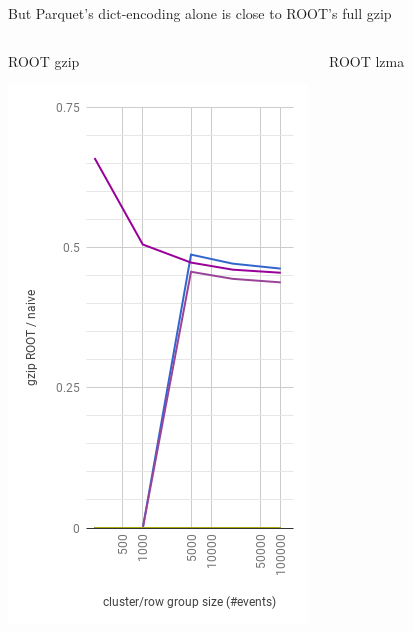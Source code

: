 \documentclass[aspectratio=169]{beamer}
\begin{document}
\begin{frame}{But Parquet's dict-encoding alone is close to ROOT's full gzip}
\begin{columns}
\begin{center}
\mbox{\hspace{3 cm}}
ROOT gzip

\includegraphics[width=\linewidth]{root-gzip-2.png}
\end{center}
\begin{center}
\mbox{\hspace{3 cm}}
ROOT lzma


\end{center}
\end{columns}
\end{frame}
\end{document}
